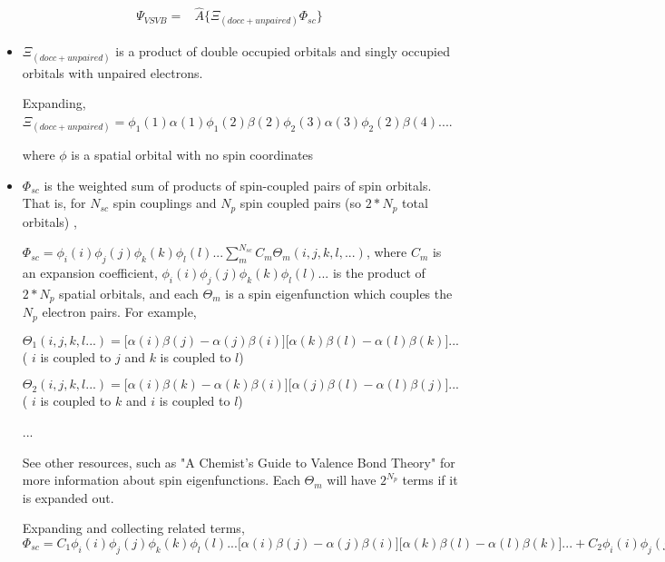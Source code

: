 \documentclass[a4paper]{article}
\begin{document}
\begin{equation}
 \begin{aligned}
 \Psi_{VSVB} = &\hat{A} \{ \Xi_{(docc+unpaired)}\Phi_{sc} \} 
 \label{init_wave}
 \end{aligned}
 \end{equation}
     
     \begin{itemize}
     \item $\Xi_{(docc+unpaired)} $ is a product of double occupied orbitals and singly occupied orbitals with unpaired electrons.
     
     Expanding, $\Xi_{(docc+unpaired)} = \phi_1(1)\alpha(1)\phi_1(2) \beta(2)\phi_2(3)\alpha(3)\phi_2(2) \beta(4)...$.
     
     where $\phi$ is a spatial orbital with no spin coordinates
     
     \item $\Phi_{sc}$ is the weighted sum of products of spin-coupled pairs of spin orbitals. 
     That is, for $N_{sc}$ spin couplings and $N_p$ spin coupled pairs (so $2*N_p$ total orbitals) , 
     
     $\displaystyle \Phi_{sc} = \phi_i(i) \phi_j(j) \phi_k(k) \phi_l(l)...\sum_m^{N_{sc}} C_m \Theta_m(i,j,k,l,...)  $,
     where $C_m$ is an expansion coefficient, $\phi_i(i) \phi_j(j) \phi_k(k) \phi_l(l)...$ is the product of $2*N_p$ spatial orbitals, and each $\Theta_m$ is a spin eigenfunction which couples the $N_p$ electron pairs.
     For example,
     
     $\Theta_1(i,j,k,l...) = \big[\alpha(i)\beta(j)-\alpha(j)\beta(i)\big] \big[\alpha(k)\beta(l)-\alpha(l)\beta(k)\big]... $ ( $i$ is coupled to $j$ and $k$ is coupled to $l$)
     
     $\Theta_2(i,j,k,l...) = \big[\alpha(i)\beta(k)-\alpha(k)\beta(i)\big] \big[\alpha(j)\beta(l)-\alpha(l)\beta(j)\big]... $ ( $i$ is coupled to $k$ and $i$ is coupled to $l$)
     
     ...
     
     See other resources, such as "A Chemist's Guide to Valence Bond Theory" for more information about spin eigenfunctions. Each $\Theta_m$ will have $2^{N_p}$ terms if it is expanded out.
     
     
      Expanding and collecting related terms,  $\displaystyle \Phi_{sc} = C_1 \phi_i(i) \phi_j(j) \phi_k(k) \phi_l(l)...  \big[\alpha(i)\beta(j)-\alpha(j)\beta(i)\big] \big[\alpha(k)\beta(l)-\alpha(l)\beta(k)\big]... + C_2 \phi_i(i) \phi_j(j) \phi_k(k) \phi_l(l) \big[\alpha(i)\beta(k)-\alpha(k)\beta(i)\big] \big[\alpha(j)\beta(l)-\alpha(l)\beta(j)\big]... + C_3... $
     \end{itemize}
     
\end{document}
